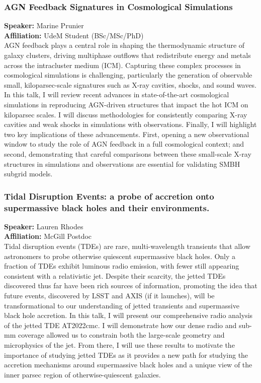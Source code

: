 \subsubsection*{AGN Feedback Signatures in Cosmological Simulations}
\textbf{Speaker:} Marine Prunier \\
\textbf{Affiliation:} UdeM \textperiodcentered{} Student (BSc/MSc/PhD)\\
AGN feedback plays a central role in shaping the thermodynamic structure of galaxy clusters, driving multiphase outflows that redistribute energy and metals across the intracluster medium (ICM). Capturing these complex processes in cosmological simulations is challenging, particularly the generation of observable small, kiloparsec-scale signatures such as X-ray cavities, shocks, and sound waves. In this talk, I will review recent advances in state-of-the-art cosmological simulations in reproducing AGN-driven structures that impact the hot ICM on kiloparsec scales. I will discuss methodologies for consistently comparing X-ray cavities and weak shocks in simulations with observations. Finally, I will highlight two key implications of these advancements. First, opening a new observational window to study the role of AGN feedback in a full cosmological context; and second, demonstrating that careful comparisons between these small-scale X-ray structures in simulations and observations are essential for validating SMBH subgrid models.

\hypertarget{abs-45}{}
\subsubsection*{Tidal Disruption Events: a probe of accretion onto supermassive black holes and their environments.}
\textbf{Speaker:} Lauren Rhodes \\
\textbf{Affiliation:} McGill \textperiodcentered{} Postdoc\\
Tidal disruption events (TDEs) are rare, multi-wavelength transients that allow astronomers to probe otherwise quiescent supermassive black holes. Only a fraction of TDEs exhibit luminous radio emission, with fewer still appearing consistent with a relativistic jet. Despite their scarcity, the jetted TDEs discovered thus far have been rich sources of information, promoting the idea that future events, discovered by LSST and AXIS (if it launches), will be transformational to our understanding of jetted transients and supermassive black hole accretion. In this talk, I will present our comprehensive radio analysis of the jetted TDE AT2022cmc. I will demonstrate how our dense radio and sub-mm coverage allowed us to constrain both the large-scale geometry and microphysics of the jet. From there, I will use these results to motivate the importance of studying jetted TDEs as it provides a new path for studying the accretion mechanisms around supermassive black holes and a unique view of the inner parsec region of otherwise-quiescent galaxies.

